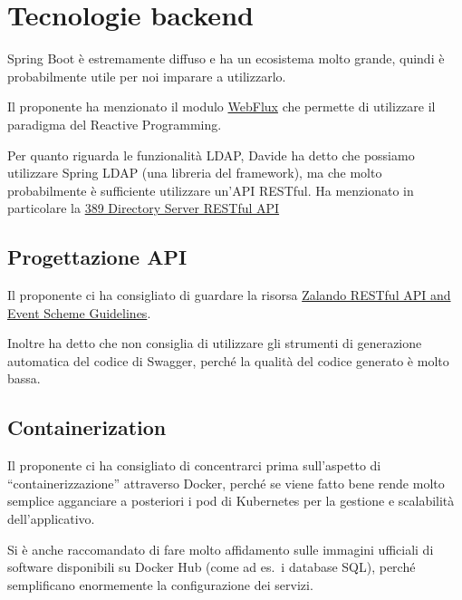 \documentclass{article}
\begin{document}

\section{Tecnologie backend}%
\label{sec:tecnologie_lato_server}

Spring Boot è estremamente diffuso e ha un ecosistema molto grande, quindi è probabilmente utile per noi imparare a utilizzarlo.

Il proponente ha menzionato il modulo \href{https://docs.spring.io/spring/docs/current/spring-framework-reference/web-reactive.html}{WebFlux} che permette di utilizzare il paradigma del Reactive Programming.

Per quanto riguarda le funzionalità LDAP, Davide ha detto che possiamo utilizzare Spring LDAP (una libreria del framework), ma che molto probabilmente è sufficiente utilizzare un'API RESTful.
Ha menzionato in particolare la \href{https://directory.fedoraproject.org/docs/389ds/design/ldap-rest-api.html}{389 Directory Server RESTful API}

\subsection{Progettazione API}%
\label{sub:progettazione_api}

Il proponente ci ha consigliato di guardare la risorsa \href{https://opensource.zalando.com/restful-api-guidelines/}{Zalando RESTful API and Event Scheme Guidelines}.

Inoltre ha detto che non consiglia di utilizzare gli strumenti di generazione automatica del codice di Swagger, perché la qualità del codice generato è molto bassa.

\subsection{Containerization}%
\label{sub:containerization}

Il proponente ci ha consigliato di concentrarci prima sull'aspetto di ``containerizzazione'' attraverso Docker, perché se viene fatto bene rende molto semplice agganciare a posteriori i pod di Kubernetes per la gestione e scalabilità dell'applicativo.

Si è anche raccomandato di fare molto affidamento sulle immagini ufficiali di software disponibili su Docker Hub (come ad es.\ i database SQL), perché semplificano enormemente la configurazione dei servizi.
\end{document}
